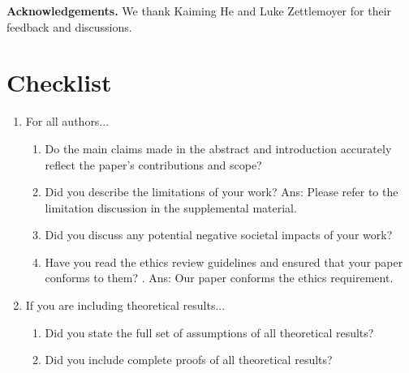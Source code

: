 \documentclass{article}
\renewcommand{\paragraph}[1]{\vspace{1.25mm}\noindent\textbf{#1}}
\begin{document}
\paragraph{Acknowledgements.} We thank Kaiming He and Luke Zettlemoyer for their feedback and discussions.




\vspace{2em}


\section*{Checklist}





\begin{enumerate}


\item For all authors...
\begin{enumerate}
  \item Do the main claims made in the abstract and introduction accurately reflect the paper's contributions and scope?
    \answerYes{}
  \item Did you describe the limitations of your work?
    \answerYes{} Ans: Please refer to the limitation discussion in the supplemental material.
  \item Did you discuss any potential negative societal impacts of your work?
    \answerNA{}
  \item Have you read the ethics review guidelines and ensured that your paper conforms to them?
    \answerYes{}. Ans: Our paper conforms the ethics requirement.
\end{enumerate}


\item If you are including theoretical results...
\begin{enumerate}
  \item Did you state the full set of assumptions of all theoretical results?
    \answerNA{}
        \item Did you include complete proofs of all theoretical results?
    \answerNA{}
\end{enumerate}



\end{enumerate}
\end{document}
